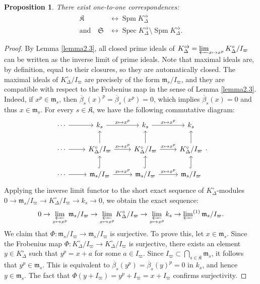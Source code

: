 \documentclass[12pts,a4paper]{amsart}
\newtheorem{proposition}{Proposition}[section]
\DeclareMathOperator{\spm}{Spm}
\DeclareMathOperator{\spec}{Spec}
\begin{document}
\begin{proposition}
    There exist one-to-one correspondences:
    \begin{align*}
        \mathfrak{K} &\leftrightarrow \spm K^{\circ\flat}_\Delta \\
        \text{and} \quad \mathfrak{S} &\leftrightarrow \spec K^{\circ\flat}_\Delta \setminus \spm K^{\circ\flat}_\Delta.
    \end{align*} 
\end{proposition}

\begin{proof}
    By Lemma \ref{lemma2.3}, all closed prime ideals of $K^{\circ\flat}_\Delta = \varprojlim_{x \mapsto x^p} K^\circ_\Delta / I_\varpi$ can be written as the inverse limit of prime ideals. Note that maximal ideals are, by definition, equal to their closures, so they are automatically closed. The maximal ideals of $K^{\circ}_\Delta / I_\varpi$ are precisely of the form $\mathfrak{m}_s / I_\varpi$, and they are compatible with respect to the Frobenius map in the sense of Lemma \ref{lemma2.3}. Indeed, if $x^p \in \mathfrak{m}_s$, then $\overline{\beta}_s(x)^p = \overline{\beta}_s(x^p) = 0$, which implies $\overline{\beta}_s(x) = 0$ and thus $x \in \mathfrak{m}_s$. For every $s \in \mathfrak{K}$, we have the following commutative diagram:
    \[
    \begin{tikzcd}
        \cdots \arrow[r] & k_s \arrow[r, "x \mapsto x^p"] & k_s \arrow[r, "x \mapsto x^p"] & k_s \\
        \cdots \arrow[r] & K^\circ_\Delta / I_\varpi \arrow[r, "x \mapsto x^p"] \arrow[u] & K^\circ_\Delta / I_\varpi \arrow[r, "x \mapsto x^p"] \arrow[u] & K^\circ_\Delta / I_\varpi \arrow[u] \\
        \cdots \arrow[r] & \mathfrak{m}_s / I_\varpi \arrow[r, "x \mapsto x^p"] \arrow[u, hookrightarrow] & \mathfrak{m}_s / I_\varpi \arrow[u, hookrightarrow] \arrow[r, "x \mapsto x^p"] & \mathfrak{m}_s / I_\varpi \arrow[u, hookrightarrow]
    \end{tikzcd}.
    \]
    Applying the inverse limit functor to the short exact sequence of $K^\circ_\Delta$-modules $0 \to \mathfrak{m}_s / I_\varpi \to K^\circ_\Delta / I_\varpi \to k_s \to 0$, we obtain the exact sequence:
    \begin{align*}
       0 \to \varprojlim_{x \mapsto x^p} \mathfrak{m}_s / I_\varpi \to \varprojlim_{x \mapsto x^p} K^\circ_\Delta / I_\varpi \to \varprojlim_{x \mapsto x^p} k_s \to \varprojlim\nolimits^{(1)} \mathfrak{m}_s / I_\varpi.
    \end{align*}
    We claim that $\Phi: \mathfrak{m}_s / I_\varpi \to \mathfrak{m}_s / I_\varpi$ is surjective. To prove this, let $x \in \mathfrak{m}_s$. Since the Frobenius map $\Phi: K^\circ_\Delta / I_\varpi \to K^\circ_\Delta / I_\varpi$ is surjective, there exists an element $y \in K^\circ_\Delta$ such that $y^p = x + a$ for some $a \in I_\varpi$. Since $I_\varpi \subset \bigcap_{s \in \mathfrak{K}} \mathfrak{m}_s$, it follows that $y^p \in \mathfrak{m}_s$. This is equivalent to $\overline{\beta}_s(y^p) = \overline{\beta}_s(y)^p = 0$ in $k_s$, and hence $y \in \mathfrak{m}_s$. The fact that $\Phi(y + I_\varpi) = y^p + I_\varpi = x + I_\varpi$ confirms surjectivity.


\end{proof}
\end{document}
